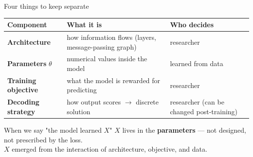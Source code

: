 \documentclass[aspectratio=169,10pt,dvipsnames]{beamer}
\begin{document}
\begin{frame}{Four things to keep separate}
\small
\renewcommand{\arraystretch}{1.35}
\begin{tabular}{@{}p{3.2cm}p{5.5cm}p{2.5cm}@{}}
\toprule
\textbf{Component} & \textbf{What it is} & \textbf{Who decides} \\
\midrule
\textbf{Architecture} & how information flows (layers, message-passing graph) & researcher \\
\textbf{Parameters} $\theta$ & numerical values inside the model & \alert{learned from data} \\
\textbf{Training objective} & what the model is rewarded for predicting & researcher \\
\textbf{Decoding strategy} & how output scores $\to$ discrete solution & researcher (can be changed post-training) \\
\bottomrule
\end{tabular}

\bigskip
\begin{block}{When we say "the model learned $X$"}
\small
$X$ lives in the \textbf{parameters} — not designed, not prescribed by the loss.\\
$X$ emerged from the interaction of architecture, objective, and data.
\end{block}
\end{frame}
\end{document}
